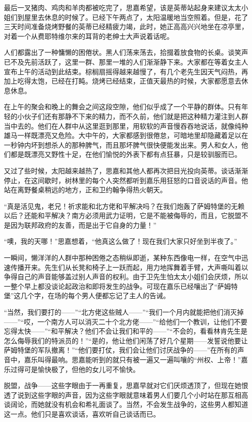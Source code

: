\par 最后一叉猪肉、鸡肉和羊肉都被吃完了，思嘉希望，该是英蒂站起身来建议太太小姐们到屋里去休息的时候了。已经下午两点了，太阳温暖地当空照着。但是，花了三天时间准备烧烤野餐的英蒂已经精疲力竭，此时，她正高高兴兴地坐在凉亭里，对着一个从费耶特维尔来的耳背的老绅士大声说着话呢。
\par 人们都露出了一种慵懒的困倦状。黑人们荡来荡去，拾掇着放食物的长桌。谈笑声已不及先前活跃了，这里一群、那里一堆的人们渐渐静下来。大家都在等着女主人宣布上午的活动到此结束。棕榈扇摇得越来越慢了，有几个老先生因天气闷热，再加上吃得太饱，已经在打盹。烧烤已经结束，正值天最热的时候，大家都愿意去休息休息。
\par 在上午的聚会和晚上的舞会之间这段空隙，他们似乎成了一个平静的群体。只有年轻的小伙子们还有那静不下来的精力，而不久前，他们就是把这种精力灌注到人群当中去的。他们在人群中从这里逛到那里，用软软的声音慢吞吞地说话，就像纯种雄马一样既漂亮又危险。大中午的，大家都感到很倦怠，可暗地里却隐藏着足以在一秒钟内坏到想杀人的那种脾气，而且那坏脾气很快便能发出来。男人和女人，他们都是既漂亮又野性十足，在他们愉悦的外表下都有点狂暴，只是较驯服而已。
\par 又过了些时候，太阳越来越热了，思嘉和其他人都再次把目光投向英蒂。谈话渐渐停止，在这间歇时，树林里的每个人突然都听到嘉乐用狂怒的口音说话的声音。他站在离野餐桌稍远的地方，正和卫约翰争得热火朝天。
\par “真是活见鬼，老兄！祈求能和北方佬和平解决吗？在我们炮轰了萨姆特堡的无赖以后？还能和平解决？南方必须用武力证明，它是不能被侮辱的，而且，它脱盟不是因为联邦政府的友善，而是出于它自身的力量！”
\par “噢，我的天哪！”思嘉想着，“他真这么做了！现在我们大家只好坐到半夜了。”
\par 一瞬间，懒洋洋的人群中那种困倦之态稍纵即逝，某种东西像电一样，在空气中迅速传播开来。先生们从长凳和椅子上一跃而起，用力地挥舞着手臂，大声嘶叫着以争得自己的声音能够盖过别人声音的权利。由于卫先生怕太太小姐们会厌烦，所以一整个早上都没谈论起政治和即将发生的战争。可现在嘉乐已经嚷出了“萨姆特堡”这几个字，在场的每个男人便都忘记了主人的告诫。
\par “当然，我们要打的——”“北方佬这些贼人——”“我们一个月内就能把他们消灭掉——”“哎，一个南方人可以消灭二十个北方佬——”“给他们一个教训，让他们不要忘得太快——”“和平解决？他们不会让我们和平的——”“不会的，看看林肯先生是怎么侮辱我们的特派员的！”“是的，他让他们闲荡了好几个星期——发誓说他要让萨姆特堡的军队撤离！”“他们要打仗，我们会让他们讨厌战争的——”在所有的声音中，嘉乐叫得最响。思嘉能听到的就只有被一遍又一遍叫嚷的“州权、上帝！”嘉乐过得可是愉快极了，但他的女儿可不愉快。
\par 脱盟，战争——这些字眼由于一再重复，思嘉早就对它们厌烦透顶了，但现在她恨透了说到这些字眼的声音，因为这些字眼就意味着男人们要几个小时站在那互相高谈阔论，而她就没有机会和希礼面谈了。当然，不会发生战争的，这些男人都知道这一点。他们只是喜欢谈话，喜欢听自己谈话而已。
